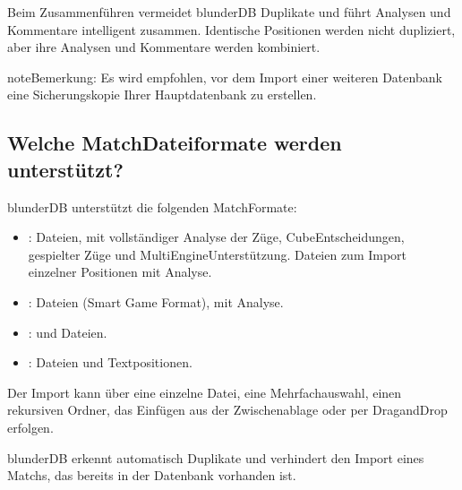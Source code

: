 \documentclass[letterpaper,10pt,german]{sphinxmanual}
\begin{document}
\sphinxAtStartPar
Beim Zusammenführen vermeidet blunderDB Duplikate und führt Analysen und Kommentare intelligent zusammen. Identische Positionen werden nicht dupliziert, aber ihre Analysen und Kommentare werden kombiniert.

\begin{sphinxadmonition}{note}{Bemerkung:}
\sphinxAtStartPar
Es wird empfohlen, vor dem Import einer weiteren Datenbank eine Sicherungskopie Ihrer Hauptdatenbank zu erstellen.
\end{sphinxadmonition}


\subsection{Welche Match\sphinxhyphen{}Dateiformate werden unterstützt?}
\label{\detokenize{faq:quels-formats-de-fichiers-de-match-sont-supportes}}
\sphinxAtStartPar
blunderDB unterstützt die folgenden Match\sphinxhyphen{}Formate:
\begin{itemize}
\item {} 
\sphinxAtStartPar
{}: \sphinxhyphen{}Dateien, mit vollständiger Analyse der Züge, Cube\sphinxhyphen{}Entscheidungen, gespielter Züge und Multi\sphinxhyphen{}Engine\sphinxhyphen{}Unterstützung. \sphinxhyphen{}Dateien zum Import einzelner Positionen mit Analyse.

\item {} 
\sphinxAtStartPar
{}: \sphinxhyphen{}Dateien (Smart Game Format), mit Analyse.

\item {} 
\sphinxAtStartPar
{}: \sphinxhyphen{} und \sphinxhyphen{}Dateien.

\item {} 
\sphinxAtStartPar
{}: \sphinxhyphen{}Dateien und Textpositionen.

\end{itemize}

\sphinxAtStartPar
Der Import kann über eine einzelne Datei, eine Mehrfachauswahl, einen rekursiven Ordner, das Einfügen aus der Zwischenablage oder per Drag\sphinxhyphen{}and\sphinxhyphen{}Drop erfolgen.

\sphinxAtStartPar
blunderDB erkennt automatisch Duplikate und verhindert den Import eines Matchs, das bereits in der Datenbank vorhanden ist.
\end{document}
